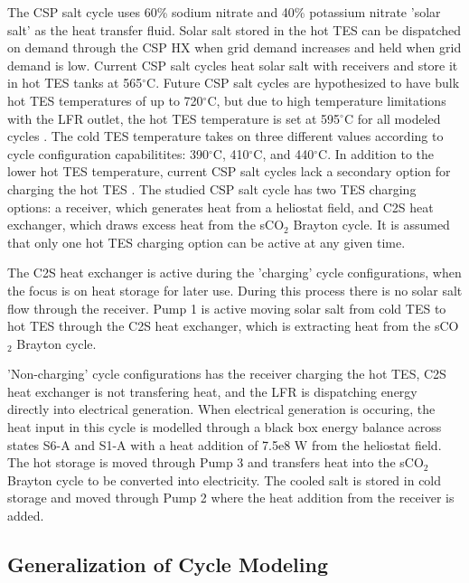 \begin{paracol}{2}
\linenumbers
\switchcolumn

The CSP salt cycle uses 60\% sodium nitrate and 40\% potassium nitrate 'solar salt' as the heat transfer fluid. Solar salt stored in the hot TES can be dispatched on demand through the CSP HX when grid demand increases and held when grid demand is low. Current CSP salt cycles heat solar salt with receivers and store it in hot TES tanks at 565$^{\circ}$C. Future CSP salt cycles are hypothesized to have bulk hot TES temperatures of up to 720$^{\circ}$C, but due to high temperature limitations with the LFR outlet, the hot TES temperature is set at 595$^{\circ}$C for all modeled cycles \cite{mehos2017concentrating}. The cold TES temperature takes on three different values according to cycle configuration capabilitites: 390$^{\circ}$C, 410$^{\circ}$C, and 440$^{\circ}$C. In addition to the lower hot TES temperature, current CSP salt cycles lack a secondary option for charging the hot TES \cite{hamilton2020dispatch}. The studied CSP salt cycle has two TES charging options: a receiver, which generates heat from a heliostat field, and C2S heat exchanger, which draws excess heat from the sCO$_2$ Brayton cycle. It is assumed that only one hot TES charging option can be active at any given time. 

The C2S heat exchanger is active during the 'charging' cycle configurations, when the focus is on heat storage for later use. During this process there is no solar salt flow through the receiver. Pump 1 is active moving solar salt from cold TES to hot TES through the C2S heat exchanger, which is extracting heat from the sCO$_2$ Brayton cycle. 

'Non-charging' cycle configurations has the receiver charging the hot TES, C2S heat exchanger is not transfering heat, and the LFR is dispatching energy directly into electrical generation. When electrical generation is occuring, the heat input in this cycle is modelled through a black box energy balance across states S6-A and S1-A with a heat addition of 7.5e8 W from the heliostat field. The hot storage is moved through Pump 3 and transfers heat into the sCO$_{2}$ Brayton cycle to be converted into electricity. The cooled salt is stored in cold storage and moved through Pump 2 where the heat addition from the receiver is added.



\subsection{Generalization of Cycle Modeling}


\end{paracol}
